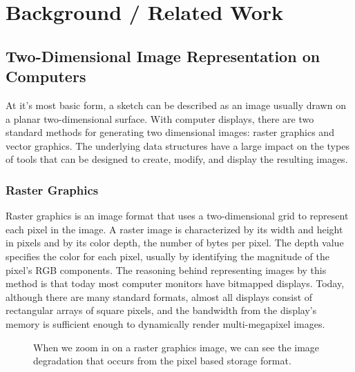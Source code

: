 \chapter{Background / Related Work}
\label{ch:relatedwork}

\section{Two-Dimensional Image Representation on Computers}
\label{sec:2dimages}

At it's most basic form, a sketch can be described as an image usually drawn on a planar two-dimensional surface.
With computer displays, there are two standard methods for generating two dimensional images: raster graphics and vector graphics.
The underlying data structures  have a large impact on the types of tools that can be designed to create, modify, and display the resulting images.

\subsection{Raster Graphics}

Raster graphics is an image format that uses a two-dimensional grid to represent each pixel in the image. 
A raster image is characterized by its width and height in pixels and by its color depth, the number of bytes per pixel. 
The depth value specifies the color for each pixel, usually by identifying the magnitude of the pixel's RGB components. 
The reasoning behind representing images by this method is that today most computer monitors have bitmapped displays. 
Today, although there are many standard formats, almost all displays consist of rectangular arrays of square pixels, and the bandwidth from the display's memory is sufficient enough to dynamically render multi-megapixel images. 
\begin{figure}
\label{fig:raster}
\caption[Zooming in on a Raster Graphics Image]{When we zoom in on a raster graphics image, we can see the image degradation that occurs from the pixel based storage format. \autocite{printingcollection}}
\end{figure}



